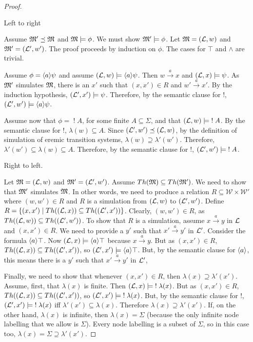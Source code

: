 \begin{proof}
\begin{case}
Left to right
\end{case}
Assume $\frak{M}' \preceq \frak{M}$ and $\frak{M} \models \phi$.
We must show $\frak{M}' \models \phi$.
Let $\frak{M} = (\mathcal{L}, w)$ and $\frak{M}' = (\mathcal{L}', w')$.
The proof proceeds by induction on $\phi$.
The cases for $\top$ and $\land$ are trivial.

Assume $\phi = \langle a \rangle \psi$ and assume  $(\mathcal{L}, w) \models  \langle a \rangle \psi$.
Then $w \xrightarrow{a} x$ and $(\mathcal{L}, x) \models  \psi$.
As $\frak{M}'$ simulates $\frak{M}$, there is an $x'$ such that $(x,x') \in R$ and $w' \xrightarrow{a} x'$.
By the induction hypothesis, $(\mathcal{L}', x') \models \psi$.
Therefore, by the semantic clause for $!$, $(\mathcal{L}', w') \models  \langle a \rangle \psi$.

Assume now that $\phi = \; ! \; A$, for some finite $A \subseteq \Sigma$, and that $(\mathcal{L}, w) \models \; ! \; A$.
By the semantic clause for $!$, $\lambda(w) \subseteq A$.
Since $(\mathcal{L}', w') \preceq (\mathcal{L}, w)$, by the definition of simulation of eremic transition systems, $\lambda(w) \supseteq \lambda'(w')$.
Therefore, $\lambda'(w') \subseteq \lambda(w) \subseteq A$.
Therefore, by the semantic clause for $!$, $(\mathcal{L}', w') \models  \; ! \; A$.

\begin{case}
Right to left.
\end{case}
Let $\frak{M} = (\mathcal{L}, w)$ and $\frak{M}' = (\mathcal{L}', w')$.
Assume $Th(\frak{M}) \subseteq Th(\frak{M}') $. We need to show that $\frak{M}'$ simulates $\frak{M}$.
In other words, we need to produce a relation $R \subseteq \mathcal{W} \times \mathcal{W}'$ where $(w,w') \in R$ and $R$ is a simulation from $(\mathcal{L}, w)$ to $ (\mathcal{L}', w')$.
Define $R = \{(x,x') \; | \; Th( (\mathcal{L}, x)) \subseteq Th( (\mathcal{L}', x'))\}$.
Clearly, $(w,w') \in R$, as $Th((\mathcal{L}, w)) \subseteq Th((\mathcal{L}', w')) $.
To show that $R$ is a simulation,  assume $x \xrightarrow{a} y$ in $\mathcal{L}$ and $(x,x') \in R$. We need to provide a $y'$ such that $x' \xrightarrow{a} y'$ in $\mathcal{L}'$.
Consider the formula $\langle a \rangle \top$. Now $(\mathcal{L}, x) \models \langle a \rangle \top$ because $x \xrightarrow{a} y$.
But as $(x,x') \in R$, $Th((\mathcal{L}, x)) \subseteq Th((\mathcal{L}', x')) $, so  $(\mathcal{L}', x') \models \langle a \rangle \top$.
But, by the semantic clause for $\MAY{a}$, this means there is a $y'$ such that $x' \xrightarrow{a} y'$ in $\mathcal{L}'$,

Finally, we need to show that whenever $(x,x') \in R$, then $\lambda(x) \supseteq \lambda'(x')$.
Assume, first, that $\lambda(x)$ is finite. 
Then $(\mathcal{L}, x) \models \; ! \; \lambda(x)$.
But as $(x,x') \in R$, $Th((\mathcal{L}, x)) \subseteq Th((\mathcal{L}', x')) $, so  $(\mathcal{L}', x') \models \; ! \; \lambda(x)$.
But, by the semantic clause for $!$, $(\mathcal{L}', x') \models \; ! \; \lambda(x)$ iff $\lambda'(x') \subseteq \lambda(x)$.
Therefore $\lambda(x) \supseteq \lambda'(x')$.
If, on the other hand, $\lambda(x)$ is infinite, then $\lambda(x) = \Sigma$ (because the only infinite node labelling that we allow is $\Sigma$). Every node labelling is a subset of $\Sigma$, so in this case too, $\lambda(x) = \Sigma \supseteq \lambda'(x')$.
\end{proof}

